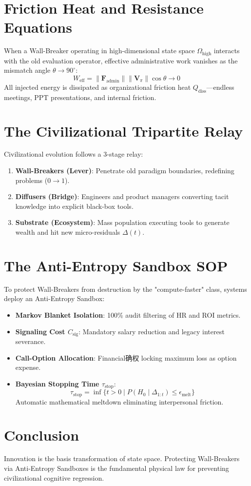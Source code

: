 \documentclass[11pt,a4paper]{article}
\begin{document}
\section{Friction Heat and Resistance Equations}
When a Wall-Breaker operating in high-dimensional state space $\Omega_{\text{high}}$ interacts with the old evaluation operator, effective administrative work vanishes as the mismatch angle $\theta \to 90^\circ$:
\begin{equation}
W_{\text{eff}} = \|\mathbf{F}_{\text{admin}}\| \|\mathbf{V}_\pi\| \cos \theta \to 0
\end{equation}
All injected energy is dissipated as organizational friction heat $Q_{\text{diss}}$—endless meetings, PPT presentations, and internal friction.

\section{The Civilizational Tripartite Relay}
Civilizational evolution follows a 3-stage relay:
\begin{enumerate}
    \item \textbf{Wall-Breakers (Lever)}: Penetrate old paradigm boundaries, redefining problems ($0 \to 1$).
    \item \textbf{Diffusers (Bridge)}: Engineers and product managers converting tacit knowledge into explicit black-box tools.
    \item \textbf{Substrate (Ecosystem)}: Mass population executing tools to generate wealth and hit new micro-residuals $\Delta(t)$.
\end{enumerate}

\section{The Anti-Entropy Sandbox SOP}
To protect Wall-Breakers from destruction by the "compute-faster" class, systems deploy an Anti-Entropy Sandbox:
\begin{itemize}
    \item \textbf{Markov Blanket Isolation}: 100\% audit filtering of HR and ROI metrics.
    \item \textbf{Signaling Cost $C_{\text{sig}}$}: Mandatory salary reduction and legacy interest severance.
    \item \textbf{Call-Option Allocation}: Financial确权 locking maximum loss as option expense.
    \item \textbf{Bayesian Stopping Time $\tau_{\text{stop}}$}:
    \begin{equation}
    \tau_{\text{stop}} = \inf \{ t > 0 \mid P(H_0 \mid \Delta_{1:t}) \le \epsilon_{\text{melt}} \}
    \end{equation}
    Automatic mathematical meltdown eliminating interpersonal friction.
\end{itemize}

\section{Conclusion}
Innovation is the basis transformation of state space. Protecting Wall-Breakers via Anti-Entropy Sandboxes is the fundamental physical law for preventing civilizational cognitive regression.
\end{document}
